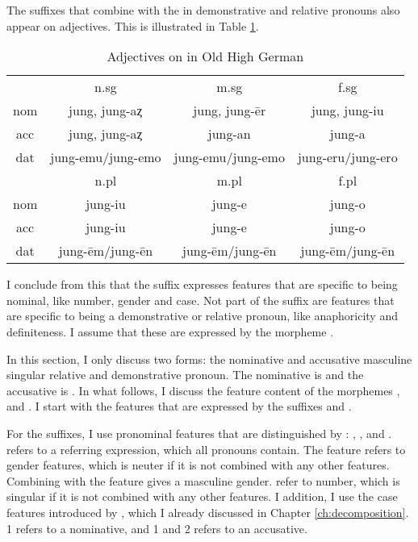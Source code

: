 The suffixes that combine with the  in demonstrative and relative pronouns also appear on adjectives. This is illustrated in Table \ref{tbl:adj-ohg}.

\begin{table}[H]
 \center
 \caption {Adjectives on  in Old High German }
  \begin{tabular}{cccc}
  \toprule
            & \ac{n}.\ac{sg}    & \ac{m}.\ac{sg}      & \ac{f}.\ac{sg}    \\
    \cmidrule{2-4}
  \ac{nom}  & jung, jung-aȥ     & jung, jung-ēr       & jung, jung-iu     \\
  \ac{acc}  & jung, jung-aȥ     & jung-an             & jung-a            \\
  \ac{dat}  & jung-emu/jung-emo & jung-emu/jung-emo   & jung-eru/jung-ero \\
  \bottomrule
            & \ac{n}.\ac{pl}    & \ac{m}.\ac{pl}      &  \ac{f}.\ac{pl}   \\
      \cmidrule{2-4}
  \ac{nom}  & jung-iu           &  jung-e             & jung-o            \\
  \ac{acc}  & jung-iu           &  jung-e             & jung-o            \\
  \ac{dat}  & jung-ēm/jung-ēn   &  jung-ēm/jung-ēn    & jung-ēm/jung-ēn   \\
    \bottomrule
  \end{tabular}
  \label{tbl:adj-ohg}
\end{table}

I conclude from this that the suffix expresses features that are specific to being nominal, like number, gender and case. Not part of the suffix are features that are specific to being a demonstrative or relative pronoun, like anaphoricity and definiteness. I assume that these are expressed by the morpheme .

In this section, I only discuss two forms: the nominative and accusative masculine singular relative and demonstrative pronoun. The nominative is  and the accusative is . In what follows, I discuss the feature content of the morphemes ,  and . I start with the features that are expressed by the suffixes  and .

For the suffixes, I use pronominal features that are distinguished by \citet{harley2002}: , ,  and .  refers to a referring expression, which all pronouns contain. The feature  refers to gender features, which is neuter if it is not combined with any other features. Combining  with the feature  gives a masculine gender.  refer to number, which is singular if it is not combined with any other features.
I addition, I use the case features introduced by \citet{caha2009}, which I already discussed in Chapter \ref{ch:decomposition}. 1 refers to a nominative, and 1 and 2 refers to an accusative.

